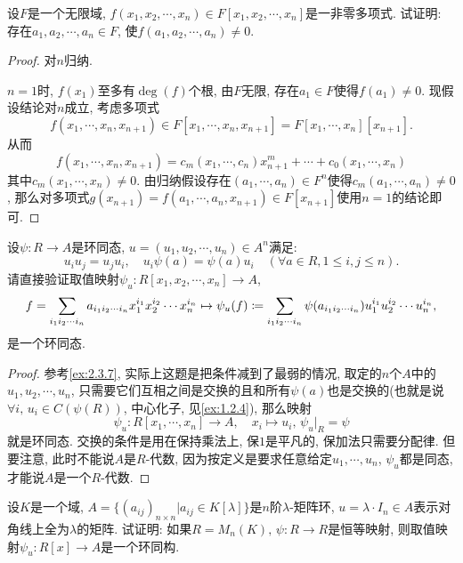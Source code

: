\begin{problem}
    设$F$是一个无限域, $f(x_1, x_2, \cdots ,x_n) \in F[x_1, x_2, \cdots,x_n]$是一非零多项式. 试证明: 存在$a_1, a_2, \cdots, a_n \in F$, 使$f(a_1, a_2, \cdots, a_n) \neq 0$.
\end{problem}

\begin{proof}
    对$n$归纳.
    
    $n = 1$时, $f(x_1)$至多有$\deg(f)$个根, 由$F$无限, 存在$a_1 \in F$使得$f(a_1) \neq 0$. 现假设结论对$n$成立, 考虑多项式
    \[
        f(x_1, \cdots, x_n, x_{n + 1}) \in F[x_1, \cdots, x_n, x_{n + 1}] = F[x_1, \cdots, x_n][x_{n + 1}].
    \]
    从而
    \[
        f(x_1, \cdots, x_n, x_{n + 1}) = c_m(x_1, \cdots, c_n)x_{n + 1}^m + \cdots + c_0(x_1, \cdots, x_n)
    \]
    其中$c_m(x_1, \cdots, x_n) \neq 0$. 由归纳假设存在$(a_1, \cdots, a_n) \in F^n$使得$c_m(a_1, \cdots, a_n) \neq 0$, 那么对多项式$g(x_{n + 1}) = f(a_1, \cdots, a_n, x_{n + 1}) \in F[x_{n + 1}]$使用$n = 1$的结论即可.
\end{proof}

\begin{problem}\label{ex:2.4.5}
    设$\psi:R \to A$是环同态, $u = (u_1, u_2, \cdots, u_n) \in A^n$满足:
\[
    u_iu_j = u_ju_i,\quad u_i\psi(a) = \psi(a)u_i \quad (\forall a \in R, 1 \leqslant i, j \leqslant n).
\]
请直接验证取值映射$\psi_u:R[x_1, x_2, \cdots, x_n] \to A$,
\[
    f = \sum_{i_1i_2\cdots i_n} a_{i_1i_2\cdots i_n}x_1^{i_1}x_2^{i_2}\cdots x_n^{i_n}
    \mapsto \psi_u(f) \mathrel{\coloneqq} \sum_{i_1i_2\cdots i_n} \psi(a_{i_1i_2\cdots i_n})u_1^{i_1}u_2^{i_2}\cdots u_n^{i_n},
\]
是一个环同态.
\end{problem}

\begin{proof}
    参考\ref{ex:2.3.7}, 实际上这题是把条件减到了最弱的情况, 取定的$n$个$A$中的$u_1, u_2, \cdots, u_n$, 只需要它们互相之间是交换的且和所有$\psi(a)$也是交换的(也就是说$\forall i,\, u_i \in C(\psi(R))$, 中心化子, 见\ref{ex:1.2.4}), 那么映射
    \[
        \psi_u:R[x_1, \cdots, x_n] \to A,\quad x_i \mapsto u_i,\,  \psi_u|_R = \psi
    \]
    就是环同态. 交换的条件是用在保持乘法上, 保$1$是平凡的, 保加法只需要分配律. 但要注意, 此时不能说$A$是$R$-代数, 因为按定义是要求任意给定$u_1, \cdots, u_n$, $\psi_u$都是同态, 才能说$A$是一个$R$-代数.
\end{proof}

\begin{problem}\label{ex:2.4.6}
    设$K$是一个域, $A = \{(a_{ij})_{n \times n}|a_{ij} \in K[\lambda]\}$是$n$阶$\lambda$-矩阵环, $u = \lambda \cdot I_n \in A$表示对角线上全为$\lambda$的矩阵. 试证明: 如果$R = M_n(K),\, \psi:R \to R$是恒等映射, 则取值映射$\psi_u:R[x] \to A$是一个环同构.
\end{problem}

